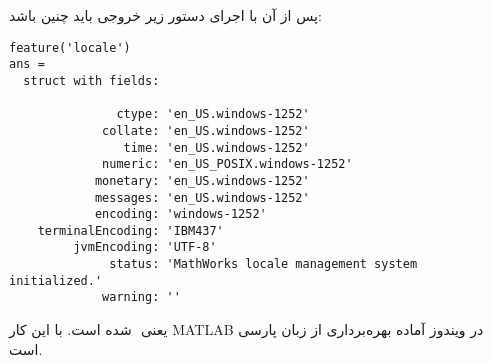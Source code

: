 \documentclass[12pt]{article}
\begin{document}
پس از آن با اجرای دستور زیر خروجی باید چنین باشد:
  \begin{latin}
\begin{lstlisting}[basicstyle=\scriptsize]
feature('locale')
ans = 
  struct with fields:

               ctype: 'en_US.windows-1252'
             collate: 'en_US.windows-1252'
                time: 'en_US.windows-1252'
             numeric: 'en_US_POSIX.windows-1252'
            monetary: 'en_US.windows-1252'
            messages: 'en_US.windows-1252'
            encoding: 'windows-1252'
    terminalEncoding: 'IBM437'
         jvmEncoding: 'UTF-8'
              status: 'MathWorks locale management system initialized.'
             warning: ''
\end{lstlisting}
\end{latin}
یعنی  ‪‬‬‬‬ شده است. با این کار MATLAB در ویندوز آماده بهره‌برداری از زبان پارسی است.
\end{document}
